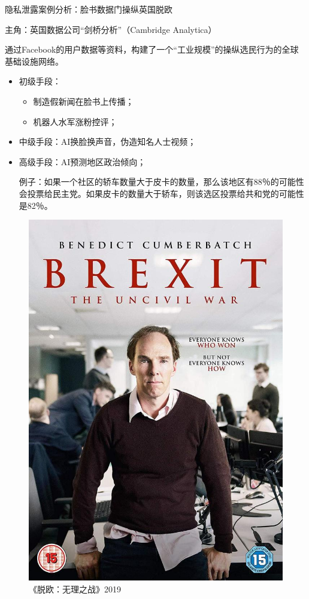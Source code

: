 \documentclass[11pt]{beamer}
\begin{document}
\begin{frame}[allowframebreaks]{隐私泄露案例分析：脸书数据门操纵英国脱欧}
	
	\begin{minipage}[t]{0.7\linewidth}

主角：英国数据公司“剑桥分析”（Cambridge Analytica）

通过Facebook的用户数据等资料，构建了一个“工业规模”的操纵选民行为的全球基础设施网络。

\begin{itemize}
	\item 初级手段：
		\begin{itemize}
			\item 制造假新闻在脸书上传播；
			\item 机器人水军涨粉控评；
		\end{itemize}
	\item 中级手段：AI换脸换声音，伪造知名人士视频；
	\item 高级手段：AI预测地区政治倾向；
	
	{\tiny 例子：如果一个社区的轿车数量大于皮卡的数量，那么该地区有88％的可能性会投票给民主党。如果皮卡的数量大于轿车，则该选区投票给共和党的可能性是82％。}
		
\end{itemize}

\end{minipage}%
	\begin{minipage}[t]{0.3\linewidth}
		\begin{figure}
			\centering
			\includegraphics[width=0.7\linewidth]{figures/privacy/brexit.jpeg}
			\caption{《脱欧：无理之战》2019}
		\end{figure}
	\end{minipage}%


\end{frame}
\end{document}
